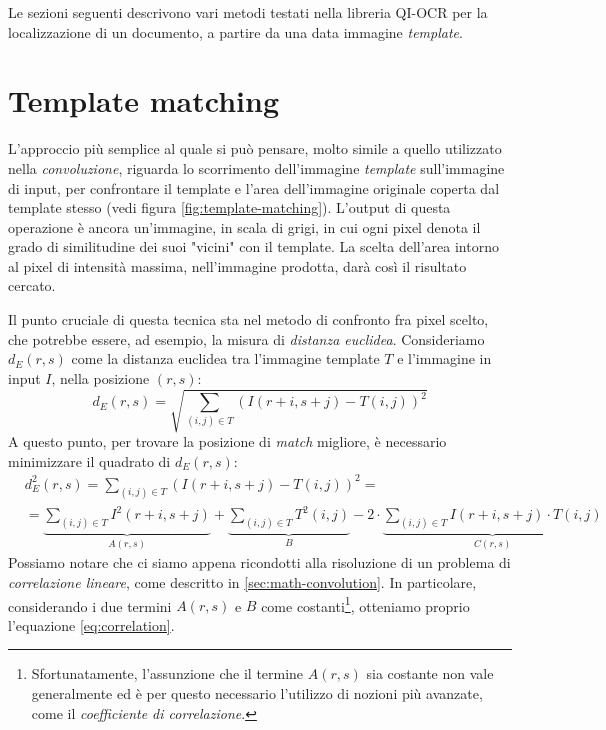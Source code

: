 Le sezioni seguenti descrivono vari metodi testati nella libreria QI-OCR per la localizzazione di un documento, a partire da una data immagine \textit{template}.


\section{Template matching}
\label{sec:template-matching}
L'approccio pi\`u semplice al quale si pu\`o pensare, molto simile a quello utilizzato nella \textit{convoluzione}, riguarda lo scorrimento dell'immagine \textit{template} sull'immagine di input, per confrontare il template e l'area dell'immagine originale coperta dal template stesso (vedi figura \ref{fig:template-matching}). L'output di questa operazione \`e ancora un'immagine, in scala di grigi, in cui ogni pixel denota il grado di similitudine dei suoi "vicini" con il template. La scelta dell'area intorno al pixel di intensit\`a massima, nell'immagine prodotta, dar\`a cos\`i il risultato cercato.\par
Il punto cruciale di questa tecnica sta nel metodo di confronto fra pixel scelto, che potrebbe essere, ad esempio, la misura di \textit{distanza euclidea}. Consideriamo $d_{E}(r, s)$ come la distanza euclidea tra l'immagine template $T$ e l'immagine in input $I$, nella posizione $(r, s)$:
\begin{equation}
	\label{eq:euclidean-distance}
	d_{E}(r, s) = \sqrt{\sum_{(i, j)\in T} (I(r + i, s + j) - T(i, j))^{2}}
\end{equation}
A questo punto, per trovare la posizione di \textit{match} migliore, \`e necessario minimizzare il quadrato di $d_{E}(r, s)$:
\begin{equation}
	\label{eq:euclidean-distance-squared}
	\begin{split}
		& d_{E}^{2}(r, s) = \sum_{(i, j)\in T} (I(r + i, s + j) - T(i, j))^{2} = \\
		& = \underbrace{\sum_{(i, j)\in T} I^{2}(r + i, s + j)}_{A(r,s)} + \underbrace{\sum_{(i, j)\in T} T^{2}(i, j)}_{B} - 2 \cdot \underbrace{\sum_{(i, j)\in T} I(r + i, s + j) \cdot T(i, j)}_{C(r,s)}  
	\end{split}
\end{equation}
Possiamo notare che ci siamo appena ricondotti alla risoluzione di un problema di \textit{correlazione lineare}, come descritto in \ref{sec:math-convolution}. In particolare, considerando i due termini $A(r,s)$ e $B$ come costanti\footnote{Sfortunatamente, l'assunzione che il termine $A(r,s)$ sia costante non vale generalmente ed \`e per questo necessario l'utilizzo di nozioni pi\`u avanzate, come il \textit{coefficiente di correlazione}.}, otteniamo proprio l'equazione \ref{eq:correlation}.\par
